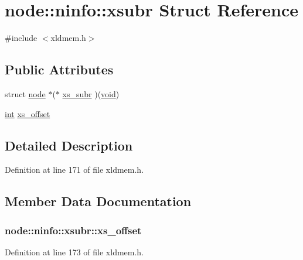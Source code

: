 \hypertarget{structnode_1_1ninfo_1_1xsubr}{}\section{node\+:\+:ninfo\+:\+:xsubr Struct Reference}
\label{structnode_1_1ninfo_1_1xsubr}


{\ttfamily \#include $<$xldmem.\+h$>$}

\subsection*{Public Attributes}
\begin{DoxyCompactItemize}
\item 
struct \hyperlink{structnode}{node} $\ast$($\ast$ \hyperlink{structnode_1_1ninfo_1_1xsubr_aedc8ae4886790f4b1c89ea7abb4f93a5}{xs\+\_\+subr} )(\hyperlink{sound_8c_ae35f5844602719cf66324f4de2a658b3}{void})
\item 
\hyperlink{xmltok_8h_a5a0d4a5641ce434f1d23533f2b2e6653}{int} \hyperlink{structnode_1_1ninfo_1_1xsubr_acb7f4c42f3bdbcc910688597010607fc}{xs\+\_\+offset}
\end{DoxyCompactItemize}


\subsection{Detailed Description}


Definition at line 171 of file xldmem.\+h.



\subsection{Member Data Documentation}
\subsubsection[{\texorpdfstring{xs\+\_\+offset}{xs_offset}}]{ node\+::ninfo\+::xsubr\+::xs\+\_\+offset}\hypertarget{structnode_1_1ninfo_1_1xsubr_acb7f4c42f3bdbcc910688597010607fc}{}\label{structnode_1_1ninfo_1_1xsubr_acb7f4c42f3bdbcc910688597010607fc}


Definition at line 173 of file xldmem.\+h.


